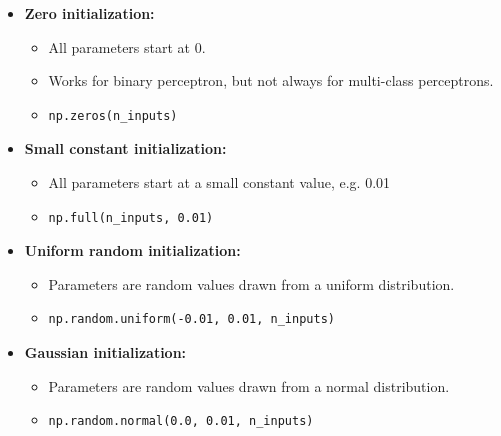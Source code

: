 \documentclass[11pt]{article}
\begin{document}
\begin{itemize}
    \item \textbf{Zero initialization:}
    \begin{itemize}
        \item All parameters start at 0.
        \item Works for binary perceptron, but not always for multi-class perceptrons.
        \item \begin{lstlisting} 
np.zeros(n_inputs)
\end{lstlisting}
    \end{itemize}
    \item \textbf{Small constant initialization:}
    \begin{itemize}
        \item All parameters start at a small constant value, e.g. 0.01
        \item \begin{lstlisting}
np.full(n_inputs, 0.01)
\end{lstlisting}
    \end{itemize}
    \item \textbf{Uniform random initialization:}
    \begin{itemize}
        \item Parameters are random values drawn from a uniform distribution.
        \item \begin{lstlisting}
np.random.uniform(-0.01, 0.01, n_inputs)            
\end{lstlisting}
    \end{itemize}
    \item \textbf{Gaussian initialization:}
    \begin{itemize}
        \item Parameters are random values drawn from a normal distribution.
        \item \begin{lstlisting}
np.random.normal(0.0, 0.01, n_inputs)            
\end{lstlisting}
    \end{itemize}
\end{itemize}
\end{document}

